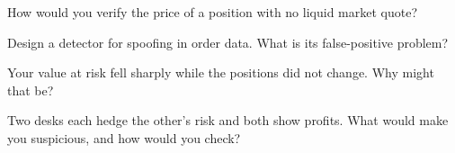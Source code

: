\begin{interviewq}\label{iq:in:risk-operations-product-control-and-compliance:3}
How would you verify the price of a position with no liquid market quote?
\end{interviewq}

\begin{interviewq}\label{iq:in:risk-operations-product-control-and-compliance:4}
Design a detector for spoofing in order data. What is its false-positive problem?
\end{interviewq}

\begin{interviewq}\label{iq:in:risk-operations-product-control-and-compliance:5}
Your value at risk fell sharply while the positions did not change. Why might that be?
\end{interviewq}

\begin{interviewq}\label{iq:in:risk-operations-product-control-and-compliance:6}
Two desks each hedge the other's risk and both show profits. What would make you suspicious, and how would you check?
\end{interviewq}
